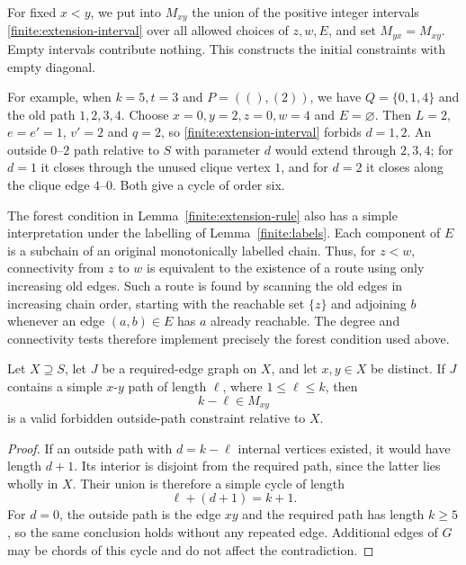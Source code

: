 For fixed \(x<y\), we put into \(M_{xy}\) the union of the positive
integer intervals \eqref{finite:extension-interval} over all allowed
choices of \(z,w,E\), and set \(M_{yx}=M_{xy}\).
Empty intervals contribute nothing.  This constructs the initial
constraints with empty diagonal.

For example, when \(k=5,t=3\) and \(P=((),(2))\), we have
\(Q=\{0,1,4\}\) and the old path \(1,2,3,4\).
Choose \(x=0,y=2,z=0,w=4\) and \(E=\varnothing\).
Then \(L=2\), \(e=e'=1\), \(v'=2\) and \(q=2\), so
\eqref{finite:extension-interval} forbids \(d=1,2\).
An outside \(0\)--\(2\) path relative to \(S\) with parameter \(d\)
would extend through \(2,3,4\); for \(d=1\) it closes through the
unused clique vertex \(1\), and for \(d=2\) it closes along the
clique edge \(4\)--\(0\).  Both give a cycle of order six.

The forest condition in Lemma~\ref{finite:extension-rule} also has a
simple interpretation under the labelling of
Lemma~\ref{finite:labels}.  Each component of \(E\) is a subchain of
an original monotonically labelled chain.  Thus, for \(z<w\),
connectivity from \(z\) to \(w\) is equivalent to the existence of a
route using only increasing old edges.  Such a route is found by
scanning the old edges in increasing chain order, starting with the
reachable set \(\{z\}\) and adjoining \(b\) whenever an edge
\((a,b)\in E\) has \(a\) already reachable.  The degree and connectivity
tests therefore implement precisely the forest condition used above.

\begin{lemma}\label{finite:required-path-rule}
Let \(X\supseteq S\), let \(J\) be a required-edge graph on \(X\), and
let \(x,y\in X\) be distinct.  If \(J\) contains a simple
\(x\)-\(y\) path of length \(\ell\), where \(1\le\ell\le k\), then
\[
 k-\ell\in M_{xy}
\]
is a valid forbidden outside-path constraint relative to \(X\).
\end{lemma}

\begin{proof}
If an outside path with \(d=k-\ell\) internal vertices existed, it
would have length \(d+1\).  Its interior is disjoint from the required
path, since the latter lies wholly in \(X\).  Their union is therefore
a simple cycle of length
\[
 \ell+(d+1)=k+1.
\]
For \(d=0\), the outside path is the edge \(xy\) and the required path
has length \(k\ge5\), so the same conclusion holds without any repeated
edge.  Additional edges of \(G\) may be chords of this cycle and do not
affect the contradiction.
\end{proof}

